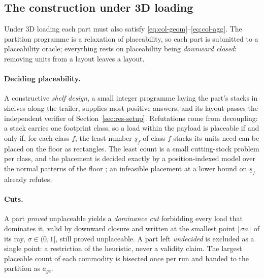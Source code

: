 

\subsection{The construction under 3D loading}
\label{sec:geo3d}

Under 3D loading each part must also satisfy
\eqref{eq:col-geom}--\eqref{eq:col-agg}. The partition programme is a
relaxation of placeability, so each part is submitted to a placeability
oracle; everything rests on placeability being \emph{downward closed}:
removing units from a layout leaves a layout.

\paragraph{Deciding placeability.}
A constructive \emph{shelf design}, a small integer programme laying
the part's stacks in shelves along the trailer, supplies most positive
answers, and its layout passes the independent verifier of
Section~\ref{sec:res-setup}. Refutations come from decoupling: a stack
carries one footprint class, so a load within the payload is placeable
if and only if, for each class $f$, the least number
$\underline{s}_{f}$ of class-$f$ stacks its units need can be placed on
the floor as rectangles. The least count is a small cutting-stock
problem per class, and the placement is decided exactly by a
position-indexed model over the normal patterns of the floor
\autocite{ChristofidesWhitlock1977,Beasley1985}; an infeasible placement
at a lower bound on $\underline{s}_{f}$ already refutes.

\paragraph{Cuts.}
A part \emph{proved} unplaceable yields a \emph{dominance cut}
forbidding every load that dominates it, valid by downward closure and
written at the smallest point $\lfloor\sigma a\rfloor$ of its ray,
$\sigma\in(0,1]$, still proved unplaceable. A part left
\emph{undecided} is excluded as a single point: a restriction of the
heuristic, never a validity claim. The largest placeable count of each
commodity is bisected once per run and handed to the partition as
$\bar a_{gc}$.

